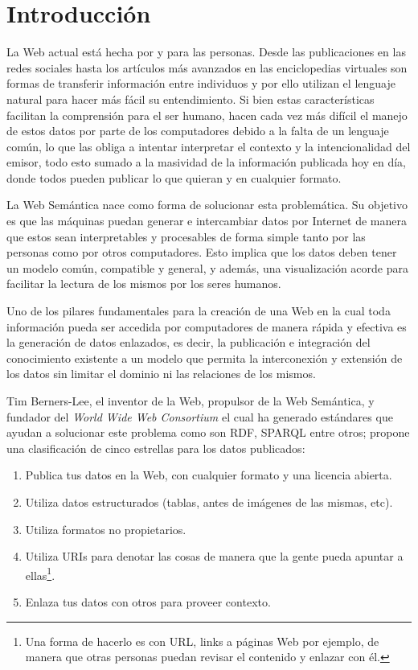 
\chapter{Introducción}\label{ch:intro}

La Web actual está hecha por y para las personas. Desde las publicaciones en las
redes sociales hasta los artículos más avanzados en las enciclopedias virtuales
son formas de transferir información entre individuos y por ello utilizan el
lenguaje natural para hacer más fácil su entendimiento. Si bien estas
características facilitan la comprensión para el ser humano, hacen cada
vez más difícil el manejo de estos datos por parte de los computadores debido a
la falta de un lenguaje común, lo que las obliga a intentar interpretar el
contexto y la intencionalidad del emisor, todo esto sumado a la masividad de la
información publicada hoy en día, donde todos pueden publicar lo que quieran y
en cualquier formato.

La Web Semántica nace como forma de solucionar esta problemática.
Su objetivo es que las máquinas puedan generar e intercambiar datos por Internet 
de manera que estos sean interpretables y procesables de forma simple tanto por
las personas como por otros computadores.
Esto implica que los datos deben tener un modelo común, compatible y general,
y además, una visualización acorde para facilitar la lectura de los mismos por
los seres humanos.

Uno de los pilares fundamentales para la creación de una Web en la cual toda
información pueda ser accedida por computadores de manera rápida y efectiva es
la generación de datos enlazados, es decir, la publicación e integración del 
conocimiento existente a un modelo que permita la interconexión y extensión de
los datos sin limitar el dominio ni las relaciones de los mismos.

Tim Berners-Lee, el inventor de la Web, propulsor de la Web Semántica,
y fundador del \emph{World Wide Web Consortium} el cual ha generado estándares
que ayudan a solucionar este problema como son RDF, SPARQL entre otros;
propone una clasificación de cinco estrellas para los datos publicados:
\begin{enumerate}
  \item
    Publica tus datos en la Web, con cualquier formato y una licencia abierta.
  \item
    Utiliza datos estructurados (tablas, antes de imágenes de las mismas, etc).
  \item
    Utiliza formatos no propietarios.
  \item
    Utiliza URIs para denotar las cosas de manera que la gente pueda apuntar a
    ellas\footnote{
    Una forma de hacerlo es con URL, links a páginas Web por ejemplo, de manera
    que otras personas puedan revisar el contenido y enlazar con él.}.
  \item
    Enlaza tus datos con otros para proveer contexto.
\end{enumerate}

